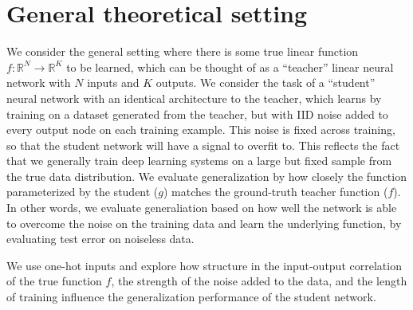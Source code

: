 \documentclass{article}
\newcommand{\R}{\mathbb{R}}
\begin{document}
\section{General theoretical setting}
We consider the general setting where there is some true linear function \(f: \R^N \rightarrow \R^K\) to be learned, which can be thought of as a ``teacher'' linear neural network with \(N\) inputs and \(K\) outputs. We consider the task of a ``student'' neural network with an identical architecture to the teacher, which learns by training on a dataset generated from the teacher, but with IID noise added to every output node on each training example. This noise is fixed across training, so that the student network will have a signal to overfit to. This reflects the fact that we generally train deep learning systems on a large but fixed sample from the true data distribution. We evaluate generalization by how closely the function parameterized by the student (\(g\)) matches the ground-truth teacher function (\(f\)). In other words, we evaluate generaliation based on how well the network is able to overcome the noise on the training data and learn the underlying function, by evaluating test error on noiseless data. \par
We use one-hot inputs and explore how structure in the input-output correlation of the true function \(f\), the strength of the noise added to the data, and the length of training influence the generalization performance of the student network.  
\end{document}
